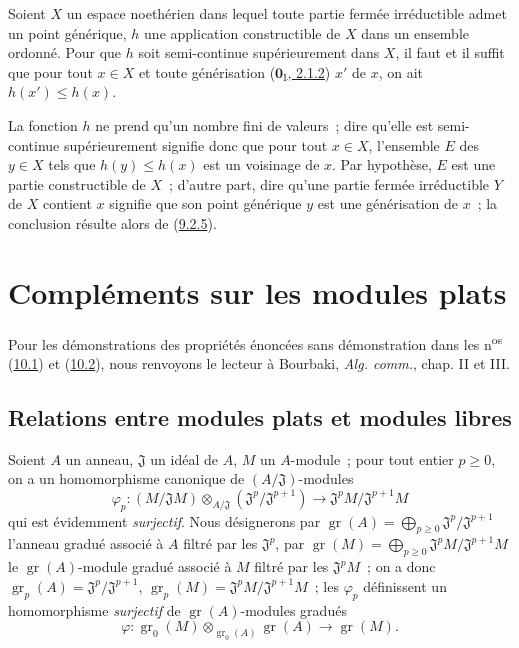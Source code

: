 \begin{proposition}[9.3.4]
\label{0.9.3.4-fr}
Soient $X$ un espace noethérien dans lequel toute partie fermée irréductible
admet un point générique, $h$ une application constructible de $X$ dans un
ensemble ordonné. Pour que $h$ soit semi-continue supérieurement dans $X$,
il faut et il suffit que pour tout $x\in X$ et toute générisation
\textup{(\hyperref[0.2.1.2-fr]{$\mathbf{0}_{\mathrm I}$, 2.1.2})} $x'$ de $x$, on ait
$h(x')\leq h(x)$.
\end{proposition}

La fonction $h$ ne prend qu'un nombre fini de valeurs~; dire qu'elle est
semi-continue supérieurement signifie donc que pour tout $x\in X$,
l'ensemble $E$ des $y\in X$ tels que $h(y)\leq h(x)$ est un voisinage de $x$.
Par hypothèse, $E$ est une partie constructible de $X$~; d'autre part, dire
qu'une partie fermée irréductible $Y$ de $X$ contient $x$ signifie que son
point générique $y$ est une générisation de $x$~; la conclusion résulte
alors de (\hyperref[0.9.2.5-fr]{9.2.5}).

\section{Compléments sur les modules plats}
\label{section:0.10-fr}

Pour les démonstrations des propriétés énoncées sans démonstration dans les
n\textsuperscript{os} (\hyperref[subsection:0.10.1-fr]{10.1}) et
(\hyperref[subsection:0.10.2-fr]{10.2}), nous renvoyons le lecteur à Bourbaki,
\emph{Alg. comm.}, chap. II et III.

\subsection{Relations entre modules plats et modules libres}
\label{subsection:0.10.1-fr}

\begin{env}[10.1.1]
\label{0.10.1.1-fr}
Soient $A$ un anneau, $\mathfrak{J}$ un idéal de $A$, $M$ un $A$-module~; pour
tout entier $p\geq0$, on a un homomorphisme canonique de
$(A/\mathfrak{J})$-modules
\[
\label{0.10.1.1.1-fr}
  \varphi_p:(M/\mathfrak{J}M)\otimes_{A/\mathfrak{J}}
  (\mathfrak{J}^p/\mathfrak{J}^{p+1})
  \longrightarrow \mathfrak{J}^pM/\mathfrak{J}^{p+1}M
  \tag{10.1.1.1}
\]
qui est évidemment \emph{surjectif}. Nous désignerons par
$\operatorname{gr}(A)=\bigoplus_{p\geq0}\mathfrak{J}^p/\mathfrak{J}^{p+1}$ l'anneau gradué
associé à $A$ filtré par les $\mathfrak{J}^p$, par
$\operatorname{gr}(M)=\bigoplus_{p\geq0}\mathfrak{J}^pM/\mathfrak{J}^{p+1}M$ le
$\operatorname{gr}(A)$-module gradué associé à $M$ filtré par les $\mathfrak{J}^pM$~; on a
donc $\operatorname{gr}_p(A)=\mathfrak{J}^p/\mathfrak{J}^{p+1}$,
$\operatorname{gr}_p(M)=\mathfrak{J}^pM/\mathfrak{J}^{p+1}M$~; les $\varphi_p$ définissent
un homomorphisme \emph{surjectif} de $\operatorname{gr}(A)$-modules gradués
\[
\label{0.10.1.1.2-fr}
  \varphi:\operatorname{gr}_0(M)\otimes_{\operatorname{gr}_0(A)}
  \operatorname{gr}(A)\longrightarrow\operatorname{gr}(M).
  \tag{10.1.1.2}
\]
\end{env}

